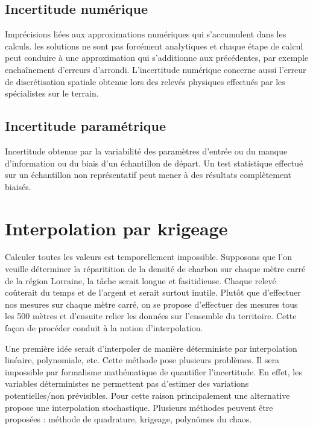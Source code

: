 \documentclass[hidelinks,12pt]{article}
\begin{document}
\subsection{Incertitude numérique}


Imprécisions liées aux approximations numériques qui s’accumulent dans les calculs. les solutions ne sont pas forcément analytiques et chaque étape de calcul peut conduire à une approximation qui s’additionne aux précédentes, par exemple enchaînement d’erreurs d’arrondi. L’incertitude numérique concerne aussi l’erreur de discrétisation spatiale obtenue lors des relevés physiques effectués par les spécialistes sur le terrain.

\subsection{Incertitude paramétrique}

Incertitude obtenue par la variabilité des paramètres d’entrée ou du manque d’information ou du biais d’un échantillon de départ. Un test statistique effectué sur un échantillon non représentatif peut mener à des résultats complètement biaisés.



\section{Interpolation par krigeage}

Calculer toutes les valeurs est temporellement impossible. Supposons que l'on veuille déterminer la réparitition de la densité de charbon sur chaque mètre carré de la région Lorraine, la tâche serait longue et fasitidieuse. Chaque relevé coûterait du temps et de l'argent et serait surtout inutile. Plutôt que d'effectuer nos mesures sur chaque mètre carré, on se propose d'effectuer des mesures tous les 500 mètres et d'ensuite relier les données sur l'ensemble du territoire. Cette façon de procéder conduit à la notion d'interpolation.

Une première idée serait d'interpoler de manière déterministe par interpolation linéaire, polynomiale, etc. Cette méthode pose plusieurs problèmes. Il sera impossible par formalisme mathématique de quantifier l'incertitude. En effet, les variables déterministes ne permettent pas d'estimer des variations potentielles/non prévisibles. Pour cette raison principalement une alternative propose une interpolation stochastique. Plusieurs méthodes peuvent être proposées : méthode de quadrature, krigeage, polynômes du chaos.
\end{document}
